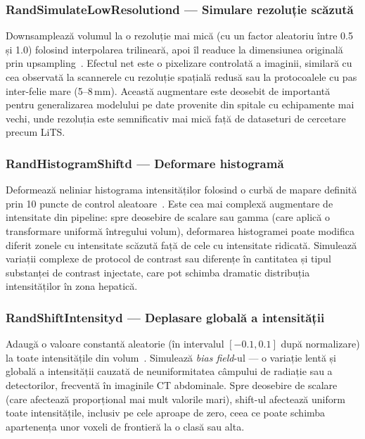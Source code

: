\documentclass[12pt, a4paper]{report}
\begin{document}
\subsubsection{RandSimulateLowResolutiond — Simulare rezoluție scăzută}
\label{sec:lowres}

Downsamplează volumul la o rezoluție mai mică (cu un factor aleatoriu între 0.5 și 1.0)
folosind interpolarea trilineară, apoi îl readuce la dimensiunea originală prin upsampling~\cite{isensee2019automated}.
Efectul net este o pixelizare controlată a imaginii, similară cu cea observată la scannerele
cu rezoluție spațială redusă sau la protocoalele cu pas inter-felie mare (5--8\,mm).
Această augmentare este deosebit de importantă pentru generalizarea modelului pe date
provenite din spitale cu echipamente mai vechi, unde rezoluția este semnificativ mai mică
față de dataseturi de cercetare precum LiTS.

\subsubsection{RandHistogramShiftd — Deformare histogramă}
\label{sec:histshift}

Deformează neliniar histograma intensităților folosind o curbă de mapare definită prin
10 puncte de control aleatoare~\cite{cardoso2022monai}. Este cea mai complexă augmentare de intensitate din pipeline:
spre deosebire de scalare sau gamma (care aplică o transformare uniformă întregului volum),
deformarea histogramei poate modifica diferit zonele cu intensitate scăzută față de cele
cu intensitate ridicată. Simulează variații complexe de protocol de contrast sau diferențe
în cantitatea și tipul substanței de contrast injectate, care pot schimba dramatic
distribuția intensităților în zona hepatică.

\subsubsection{RandShiftIntensityd — Deplasare globală a intensității}
\label{sec:shiftintensity}

Adaugă o valoare constantă aleatorie (în intervalul $[-0.1, 0.1]$ după normalizare)
la toate intensitățile din volum~\cite{isensee2019automated}. Simulează \textit{bias field}-ul — o variație lentă
și globală a intensității cauzată de neuniformitatea câmpului de radiație sau a detectorilor,
frecventă în imaginile CT abdominale. Spre deosebire de scalare (care afectează
proporțional mai mult valorile mari), shift-ul afectează uniform toate intensitățile,
inclusiv pe cele aproape de zero, ceea ce poate schimba apartenența unor voxeli
de frontieră la o clasă sau alta.
\end{document}
